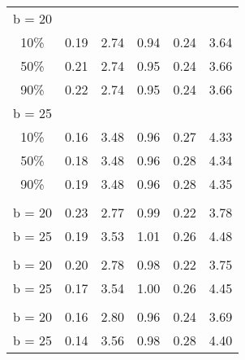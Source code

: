 \begin{tabular}{cccccc}
 \multicolumn{6}{l}{b = 20}                                                                              \\  


10\%    & 0.19                      & 2.74          & 0.94            & 0.24             & 3.64          \\
50\%    & 0.21                      & 2.74          & 0.95            & 0.24             & 3.66          \\
90\%    & 0.22                      & 2.74          & 0.95            & 0.24             & 3.66    \\   
 \multicolumn{6}{l}{b = 25}                                                                              \\  



10\% & 0.16                      & 3.48          & 0.96            & 0.27             & 4.33          \\
50\% & 0.18                      & 3.48          & 0.96            & 0.28             & 4.34          \\
90\% & 0.19                      & 3.48          & 0.96            & 0.28             & 4.35    \\  

\addlinespace
\multicolumn{6}{l}{$p^a$ = \$44.3}  \\

 b = 20 &  0.23 &  2.77 &  0.99 &  0.22 &  3.78 \\
 b = 25 &  0.19 &  3.53 &  1.01 &  0.26 &  4.48 \\

\addlinespace
\multicolumn{6}{l}{$p^a$ = \$41.1}  \\

 b = 20 &  0.20 &  2.78 &  0.98 &  0.22 &  3.75 \\
 b = 25 &  0.17 &  3.54 &  1.00 &  0.26 &  4.45 \\
 
\addlinespace
\multicolumn{6}{l}{$p^a$ = \$35.7}  \\

 b = 20 &  0.16 &  2.80 &  0.96 &  0.24 &  3.69 \\
 b = 25 &  0.14 &  3.56 &  0.98 &  0.28 &  4.40 \\
\bottomrule

\end{tabular}





